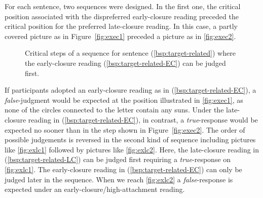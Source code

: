 \documentclass[fleqn,reqno,10pt,draft]{article}
\begin{document}
For each sentence, two sequences were designed. In the first one, the
critical position associated with the dispreferred early-closure
reading preceded the critical position for the preferred late-closure
reading. In this case, a partly covered picture as in
Figure~\ref{fig:exec1} preceded a picture as in \ref{fig:exec2}.
%
\begin{figure}[ht]
	\centering
	\caption[]{Critical steps of a sequence for sentence
          (\ref{bsp:target-related}) where the early-closure reading
          (\ref{bsp:target-related-EC}) can be judged first.}
	\label{fig:exec}
\end{figure}
%
If participants adopted an early-closure reading as in
(\ref{bsp:target-related-EC}), a \emph{false}-judgment would be
expected at the position illustrated in \ref{fig:exec1}, as none of
the circles connected to the letter contain any suns. Under the
late-closure reading in (\ref{bsp:target-related-EC}), in contrast, a
\emph{true}-response would be expected no sooner than in the step
shown in Figure~\ref{fig:exec2}. The order of possible judgements is
reversed in the second kind of sequence including pictures like
\ref{fig:exlc1} followed by pictures like \ref{fig:exlc2}. Here, the
late-closure reading in (\ref{bsp:target-related-LC}) can be judged
first requiring a \emph{true}-response on \ref{fig:exlc1}. The
early-closure reading in (\ref{bsp:target-related-EC}) can only be
judged later in the sequence. When we reach \ref{fig:exlc2} a
\emph{false}-response is expected under an
early-closure/high-attachment reading.
\end{document}
